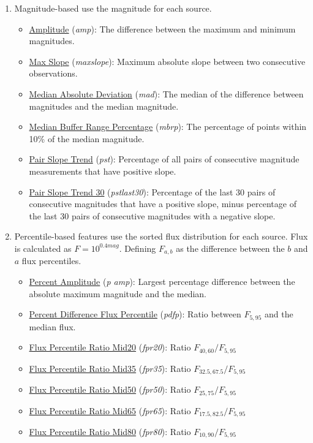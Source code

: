 \begin{enumerate}
    \item Magnitude-based use the magnitude for each source.
    \begin{itemize}
        \item \underline{Amplitude} (\textit{amp}): 
        The difference between the maximum and minimum magnitudes.
        \item \underline{Max Slope} (\textit{max\textunderscore slope}): 
        Maximum absolute slope between two consecutive observations.
        \item \underline{Median Absolute Deviation} (\textit{mad}): 
        The median of the difference between magnitudes and the median magnitude.
        \item \underline{Median Buffer Range Percentage} (\textit{mbrp}): 
        The percentage of points within 10\% of the median magnitude.
        \item \underline{Pair Slope Trend} (\textit{pst}): 
        Percentage of all pairs of consecutive magnitude measurements that have positive slope.
        \item \underline{Pair Slope Trend 30} (\textit{pst\textunderscore last30}): 
        Percentage of the last 30 pairs of consecutive magnitudes that have a positive slope, minus percentage of the last 30 pairs of consecutive magnitudes with a negative slope.
    \end{itemize}
    
    \item Percentile-based features use the sorted flux distribution for each source. Flux is calculated as $F = 10^{0.4mag}$. Defining $F_{a,b}$ as the difference between the $b$ and $a$ flux percentiles.
    \begin{itemize}
        \item \underline{Percent Amplitude} (\textit{p \textunderscore amp}): 
        Largest percentage difference between the absolute maximum magnitude and the median.
        \item \underline{Percent Difference Flux Percentile} (\textit{pdfp}): 
        Ratio between $F_{5,95}$ and the median flux.
        \item \underline{Flux Percentile Ratio Mid20} (\textit{fpr20}): 
        Ratio $F_{40,60} / F_{5,95}$
        \item \underline{Flux Percentile Ratio Mid35} (\textit{fpr35}):
        Ratio $F_{32.5,67.5} / F_{5,95}$
        \item \underline{Flux Percentile Ratio Mid50} (\textit{fpr50}): 
        Ratio $F_{25,75} / F_{5,95}$
        \item \underline{Flux Percentile Ratio Mid65} (\textit{fpr65}): 
        Ratio $F_{17.5,82.5} / F_{5,95}$
        \item \underline{Flux Percentile Ratio Mid80} (\textit{fpr80}): 
        Ratio $F_{10,90} / F_{5,95}$
    \end{itemize}
    

\end{enumerate}
